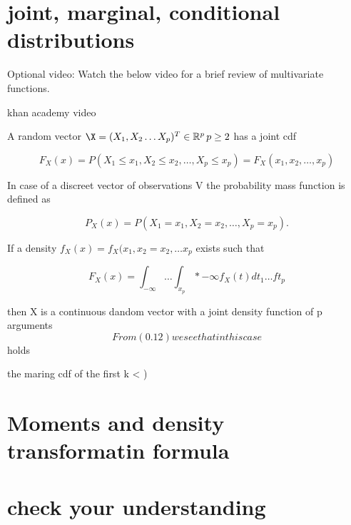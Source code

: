 \documentclass[11pt]{article}
\begin{document}
\section{joint, marginal, conditional distributions}\label{sec:joint-marginal-conditional-distributions}
Optional video: Watch the below video for a brief review of multivariate functions.

khan academy video

A random vector \(\X = (X_1, X_2 \dots X_p)^T \in \mathbb{R}^p\, p \geq 2\) has a joint cdf

\[F_X (x) = P(X_1 \leq x_1, X_2 \leq x_2 ,\dots, X_p \leq x_p ) = F_X (x_1, x_2,\dots, x_p)\]

In case of a discreet vector of observations V the probability mass function is defined as

\[P_X(x) = P(X_1  = x_1, X_2 = x_2,\dots, X_p = x_p).\]

If a density \(f_{X} (x) = f_X (x_1, x_2 = x_2,\dots x_p\) exists such that

\[F_X (x) = \int_{-\infty} \dots \int_{x_p}*{-\infty} f_X (t)dt_1 \dots ft_p\]

then X is a continuous dandom vector with a joint density function of p arguments $$ From (0.12) we see that in this case $$ holds

the maring cdf of the first k < )
\section{Moments and density transformatin formula}\label{sec:moments-and-density-transformatin-formula}


\section{check your understanding}\label{sec:check-your-understanding}
\end{document}
